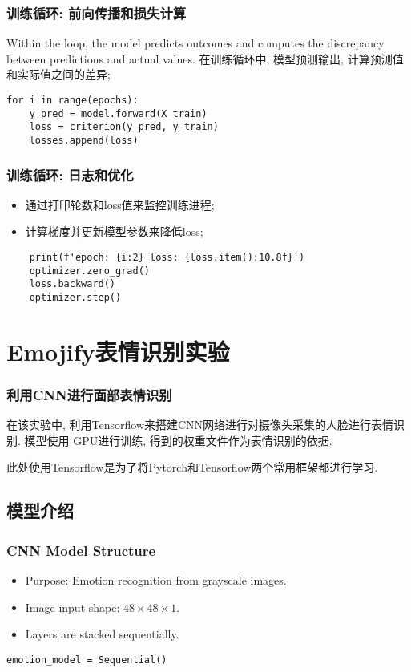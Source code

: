 \documentclass{beamer}
\begin{document}
\begin{frame}[fragile]
	\frametitle{训练循环: 前向传播和损失计算}
	Within the loop, the model predicts outcomes and computes the discrepancy between predictions and actual values.
	在训练循环中, 模型预测输出, 计算预测值和实际值之间的差异;

	\begin{verbatim}
for i in range(epochs):
    y_pred = model.forward(X_train)
    loss = criterion(y_pred, y_train)
    losses.append(loss)
\end{verbatim}
\end{frame}

\begin{frame}[fragile]
	\frametitle{训练循环: 日志和优化}
	\begin{itemize}
		\item 通过打印轮数和loss值来监控训练进程;
		\item 计算梯度并更新模型参数来降低loss;
	\end{itemize}

	\begin{verbatim}
    print(f'epoch: {i:2} loss: {loss.item():10.8f}')
    optimizer.zero_grad()
    loss.backward()
    optimizer.step()
\end{verbatim}
\end{frame}

\section{Emojify表情识别实验}
\begin{frame}
	\frametitle{利用CNN进行面部表情识别}

	在该实验中, 利用Tensorflow来搭建CNN网络进行对摄像头采集的人脸进行表情识别. 模型使用
	GPU进行训练, 得到的权重文件作为表情识别的依据.

	此处使用Tensorflow是为了将Pytorch和Tensorflow两个常用框架都进行学习.

\end{frame}

\subsection{模型介绍}
\begin{frame}[fragile]
	\frametitle{CNN Model Structure}
	\begin{itemize}
		\item Purpose: Emotion recognition from grayscale images.
		\item Image input shape: \(48 \times 48 \times 1\).
		\item Layers are stacked sequentially.
	\end{itemize}
	\begin{verbatim}
emotion_model = Sequential()
\end{verbatim}
\end{frame}
\end{document}
